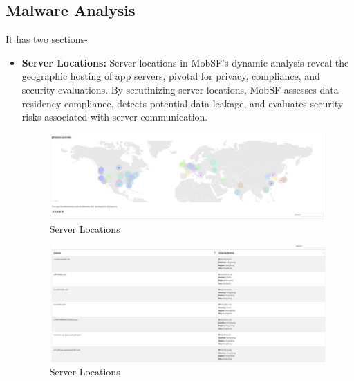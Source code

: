 \documentclass{report}
\begin{document}
\subsection{Malware Analysis}
It has two sections-
\begin{itemize}
    \item \textbf {Server Locations: } Server locations in MobSF's dynamic analysis reveal the geographic hosting of app servers, pivotal for privacy, compliance, and security evaluations. By scrutinizing server locations, MobSF assesses data residency compliance, detects potential data leakage, and evaluates security risks associated with server communication.
    \begin{figure}[hbt!]
    \centering
    \includegraphics[width=0.5\linewidth]{Dynamic Analyzer/server_rep.jpg}
    \caption{Server Locations}
    \label{fig:example}
    \end{figure}
    \FloatBarrier

    \begin{figure}[hbt!]
    \centering
    \includegraphics[width=0.5\linewidth]{Dynamic Analyzer/server_rep2.jpg}
    \caption{Server Locations}
    \label{fig:example}
    \end{figure}
    \FloatBarrier
    

\end{itemize}
\end{document}
